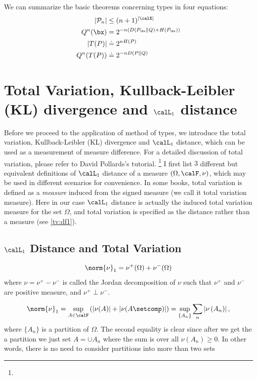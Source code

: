 \documentclass{article}
\newcommand{\one}[1]{\norm{#1}_{1}}
\newcommand{\typss}{\mathcal{P}_n}
\begin{document}
We can summarize the basic theorems concerning types in four equations:
\begin{align*}
\begin{aligned}
\left| \typss\right| & \leq(n+1)^{| \calX |} \\
Q^{n}( \bx ) &=2^{-n\left(D\left(P_{ \bx } \| Q\right)+H\left(P_{ \bx }\right)\right)} \\
|T(P)| & \doteq 2^{n H(P)} \\
Q^{n}(T(P)) & \doteq 2^{-n D(P \| Q)}
\end{aligned}
\end{align*}

\section{Total Variation, Kullback-Leibler (KL) divergence  and $\calL_1$ distance}\label{sec:tv}

Before we proceed to the application of method of types, we introduce the total variation, Kullback-Leibler (KL) divergence  and $\calL_1$ distance, which can be used as a measurement of measure difference. For a detailed discussion of total variation, please refer to David Pollards's tutorial. \footnote{} I first list $3$ different but equivalent definitions of $\calL_1$ distance of a  measure $(\Omega,\calF,\nu)$, which may be used in different scenarios for convenience. In some books, total variation is defined as a \emph{measure} induced from the signed measure (we call it total variation measure). Here in our case $\calL_1$ distance is actually the induced total variation measure for the set $\Omega$, and total variation is specified as the distance rather than a measure (see \cref{tv:df1}).

\subsection{$\calL_1$ Distance and Total Variation}
\begin{defa}{}
\begin{align}
    \one{\nu} = \nu^{+}(\Omega)+\nu^{-}(\Omega) \label{tv:eq1}
\end{align}
where $\nu=\nu^{+}-\nu^{-}$ is called the Jordan decomposition of $\nu$ such that $\nu^{+}$ and $\nu^{-}$ are positive measure, and $\nu^{+} \perp \nu^{-}$. 
\end{defa}

\begin{defa}{}
\begin{align}
\one{\nu}  = \sup_{A\in \calF} \left(\left| \nu(A)\right| + \left| \nu(A\setcomp)\right|\right) = \sup_{\{A_n\}} \sum_{n} \left|\nu\left(A_{n}\right)\right|, \label{tv:eq2}
\end{align}
where $\{A_{n}\}$ is a partition of $\Omega$. The second equality is clear since after we get the a partition we just set $A=\cup A_n$ where the sum is over all $\nu(A_n)\ge 0$. In other words, there is no need to consider partitions into more than two sets
\end{defa}
\end{document}
